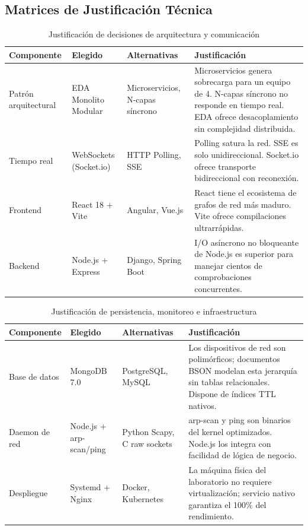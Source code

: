 \documentclass[12pt,a4paper]{report}
\begin{document}
\subsection{Matrices de Justificación Técnica}

\begin{table}[htbp]
\centering
\caption{Justificación de decisiones de arquitectura y comunicación}\label{tab:comparativa1}
\small
\begin{tabularx}{\textwidth}{p{2.4cm} p{2.6cm} p{3.2cm} X}
\toprule
\textbf{Componente} & \textbf{Elegido} & \textbf{Alternativas} & \textbf{Justificación} \\
\midrule
Patrón arquitectural & EDA Monolito Modular & Microservicios, N-capas síncrono & Microservicios genera sobrecarga para un equipo de 4. N-capas síncrono no responde en tiempo real. EDA ofrece desacoplamiento sin complejidad distribuida. \\
\midrule
Tiempo real & WebSockets (Socket.io) & HTTP Polling, SSE & Polling satura la red. SSE es solo unidireccional. Socket.io ofrece transporte bidireccional con reconexión. \\
\midrule
Frontend & React 18 + Vite & Angular, Vue.js & React tiene el ecosistema de grafos de red más maduro. Vite ofrece compilaciones ultrarrápidas. \\
\midrule
Backend & Node.js + Express & Django, Spring Boot & I/O asíncrono no bloqueante de Node.js es superior para manejar cientos de comprobaciones concurrentes. \\
\bottomrule
\end{tabularx}
\end{table}

\begin{table}[htbp]
\centering
\caption{Justificación de persistencia, monitoreo e infraestructura}\label{tab:comparativa2}
\small
\begin{tabularx}{\textwidth}{p{2.4cm} p{2.6cm} p{3.2cm} X}
\toprule
\textbf{Componente} & \textbf{Elegido} & \textbf{Alternativas} & \textbf{Justificación} \\
\midrule
Base de datos & MongoDB 7.0 & PostgreSQL, MySQL & Los dispositivos de red son polimórficos; documentos BSON modelan esta jerarquía sin tablas relacionales. Dispone de índices TTL nativos. \\
\midrule
Daemon de red & Node.js + arp-scan/ping & Python Scapy, C raw sockets & arp-scan y ping son binarios del kernel optimizados. Node.js los integra con facilidad de lógica de negocio. \\
\midrule
Despliegue & Systemd + Nginx & Docker, Kubernetes & La máquina física del laboratorio no requiere virtualización; servicio nativo garantiza el 100\% del rendimiento. \\
\bottomrule
\end{tabularx}
\end{table}
\end{document}
